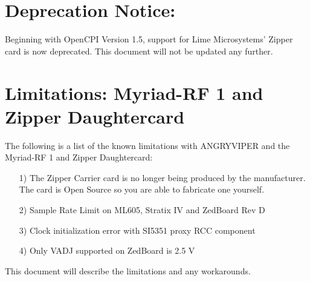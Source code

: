 \iffalse
This file is protected by Copyright. Please refer to the COPYRIGHT file
distributed with this source distribution.

This file is part of OpenCPI <http://www.opencpi.org>

OpenCPI is free software: you can redistribute it and/or modify it under the
terms of the GNU Lesser General Public License as published by the Free Software
Foundation, either version 3 of the License, or (at your option) any later
version.

OpenCPI is distributed in the hope that it will be useful, but WITHOUT ANY
WARRANTY; without even the implied warranty of MERCHANTABILITY or FITNESS FOR A
PARTICULAR PURPOSE. See the GNU Lesser General Public License for more details.

You should have received a copy of the GNU Lesser General Public License along
with this program. If not, see <http://www.gnu.org/licenses/>.
\fi


\usepackage{graphicx}
\graphicspath{ {figures/} }
\usepackage{fancyhdr}
\usepackage{colortbl}
\usepackage[justification=centering]{caption}
\pagestyle{fancy}
\renewcommand{\headrulewidth}{0pt}

\section*{Deprecation Notice:}
Beginning with OpenCPI Version 1.5, support for Lime Microsystems' Zipper card is now deprecated. This document will not be updated any further.
\section*{Limitations: Myriad-RF 1 and Zipper Daughtercard}
The following is a list of the known limitations with ANGRYVIPER and the Myriad-RF 1 and Zipper Daughtercard:\par
	\begin{itemize}
	\item[1)] The Zipper Carrier card is no longer being produced by the manufacturer. The card is Open Source so you are able to fabricate one yourself.
	\item[2)] Sample Rate Limit on ML605, Stratix IV and ZedBoard Rev D
	\item[3)] Clock initialization error with SI5351 proxy RCC component
	\item[4)] Only VADJ supported on ZedBoard is 2.5 V
	\end{itemize}
This document will describe the limitations and any workarounds.

